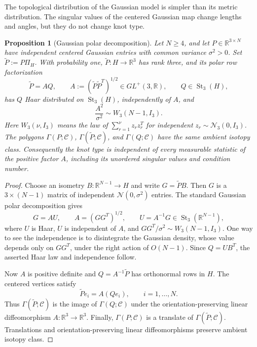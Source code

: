 \documentclass[11pt]{amsart}
\newtheorem{proposition}{Proposition}
\theoremstyle{remark}
\newcommand{\Rbb}{\mathbb{R}}
\newcommand{\1}{\mathbf{1}}
\newcommand{\St}{\operatorname{St}}
\begin{document}
The topological distribution of the Gaussian model is simpler than its metric distribution.
The singular values of the centered Gaussian map change lengths and angles, but they do not
change knot type.

\begin{proposition}[Gaussian polar decomposition]\label{prop:stiefel}
Let \(N\ge4\), and let \(P\in\Rbb^{3\times N}\) have independent centered Gaussian
entries with common variance \(\sigma^2>0\).  Set \(\widetilde P:=P\Pi_H\).  With probability
one, \(\widetilde P:H\to\Rbb^3\) has rank three, and its polar row factorization
\[
\widetilde P=AQ,\qquad
A:=(\widetilde P\widetilde P^T)^{1/2}\in GL^+(3,\Rbb),\qquad
Q\in\St_3(H),
\]
has \(Q\) Haar distributed on \(\St_3(H)\), independently of \(A\), and
\[
 \frac{A^2}{\sigma^2}\sim W_3(N-1,I_3).
\]
Here \(W_3(\nu,I_3)\) means the law of
\(\sum_{r=1}^{\nu}z_rz_r^T\) for independent \(z_r\sim\mathcal N_3(0,I_3)\).
The polygons
\(\Gamma(P;\mathcal C)\), \(\Gamma(\widetilde P;\mathcal C)\), and
\(\Gamma(Q;\mathcal C)\) have the same ambient isotopy class.
Consequently the knot type is independent of every measurable statistic of the
positive factor \(A\), including its unordered singular values and condition number.
\end{proposition}

\begin{proof}
Choose an isometry \(B:\Rbb^{N-1}\to H\) and write \(G=\widetilde P B\).  Then \(G\) is
a \(3\times(N-1)\) matrix of independent \(\mathcal N(0,\sigma^2)\) entries.  The standard
Gaussian polar decomposition \cite{Muirhead} gives
\[
 G=A U,\qquad A=(GG^T)^{1/2},\qquad U=A^{-1}G\in\St_3(\Rbb^{N-1}),
\]
where \(U\) is Haar, \(U\) is independent of \(A\), and
\(GG^T/\sigma^2\sim W_3(N-1,I_3)\).  One way to see the independence is to
disintegrate the Gaussian density, whose value depends only on \(GG^T\), under the
right action of \(O(N-1)\).  Since \(Q=UB^T\), the asserted Haar law and independence
follow.

Now \(A\) is positive definite and \(Q=A^{-1}\widetilde P\) has orthonormal rows in \(H\).
The centered vertices satisfy
\[
\widetilde Pe_i=A(Qe_i),\qquad i=1,\dots,N.
\]
Thus \(\Gamma(\widetilde P;\mathcal C)\) is the image of
\(\Gamma(Q;\mathcal C)\) under the orientation-preserving linear diffeomorphism
\(A:\Rbb^3\to\Rbb^3\).  Finally, \(\Gamma(P;\mathcal C)\) is a translate of
\(\Gamma(\widetilde P;\mathcal C)\).  Translations and orientation-preserving linear
diffeomorphisms preserve ambient isotopy class.
\end{proof}
\end{document}
